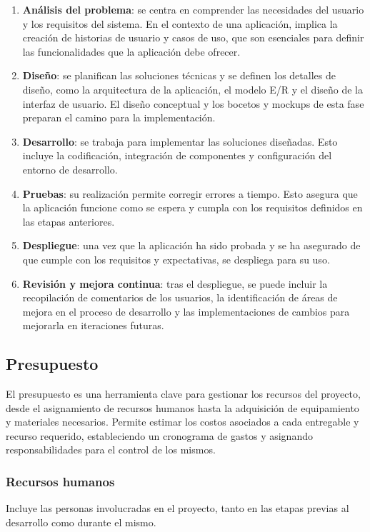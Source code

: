 \begin{enumerate}
    \item \textbf{Análisis del problema}: se centra en comprender las necesidades del usuario y los requisitos del sistema. En el contexto de una aplicación, implica la creación de historias de usuario y casos de uso, que son esenciales para definir las funcionalidades que la aplicación debe ofrecer.
    \item \textbf{Diseño}: se planifican las soluciones técnicas y se definen los detalles de diseño, como la arquitectura de la aplicación, el modelo E/R y el diseño de la interfaz de usuario. El diseño conceptual y los bocetos y mockups de esta fase preparan el camino para la implementación.
    \item \textbf{Desarrollo}: se trabaja para implementar las soluciones diseñadas. Esto incluye la codificación, integración de componentes y configuración del entorno de desarrollo.
    \item \textbf{Pruebas}: su realización permite corregir errores a tiempo. Esto asegura que la aplicación funcione como se espera y cumpla con los requisitos definidos en las etapas anteriores.
    \item \textbf{Despliegue}: una vez que la aplicación ha sido probada y se ha asegurado de que cumple con los requisitos y expectativas, se despliega para su uso.
    \item \textbf{Revisión y mejora continua}: tras el despliegue, se puede incluir la recopilación de comentarios de los usuarios, la identificación de áreas de mejora en el proceso de desarrollo y las implementaciones de cambios para mejorarla en iteraciones futuras.
\end{enumerate}


\subsection{Presupuesto}

El presupuesto es una herramienta clave para gestionar los recursos del proyecto, desde el asignamiento de recursos humanos hasta la adquisición de equipamiento y materiales necesarios. Permite estimar los costos asociados a cada entregable y recurso requerido, estableciendo un cronograma de gastos y asignando responsabilidades para el control de los mismos.

\subsubsection{Recursos humanos}
Incluye las personas involucradas en el proyecto, tanto en las etapas previas al desarrollo como durante el mismo.

